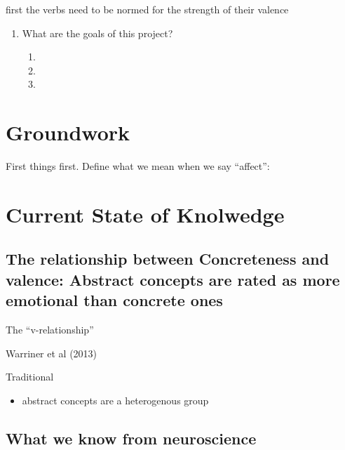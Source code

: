 \documentclass[12pt,letterpaper,table,svgnames,dvipsnames]{article}
\begin{document}
first the verbs need to be normed for the strength of their valence





\begin{enumerate}[noitemsep]
    \item What are the goals of this project?
        \begin{enumerate}[noitemsep]
            \item 
            \item 
            \item 
        \end{enumerate}
\end{enumerate}




\section{Groundwork}
First things first. Define what we mean when we say ``affect'': 



\section{Current State of Knolwedge}


\subsection{The relationship between Concreteness and valence: Abstract concepts are rated as more emotional than concrete ones}


The ``v-relationship''


Warriner et al (2013)



Traditional 


\begin{itemize}[noitemsep]
    \item abstract concepts are a heterogenous group
\end{itemize}




\subsection{What we know from neuroscience}
\end{document}
